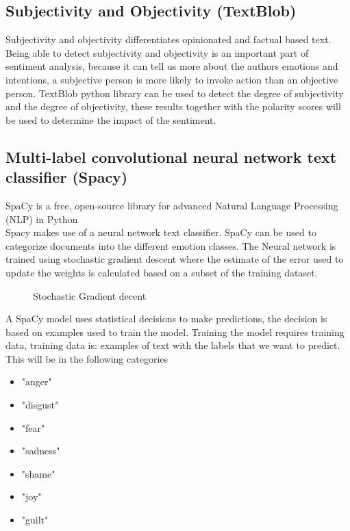 \clearpage
\subsection{Subjectivity and Objectivity (TextBlob)}
Subjectivity and objectivity differentiates opinionated and factual based text. \cite{ref2}
Being able to detect subjectivity and objectivity is an important part of sentiment analysis, because it can tell us more about the authors emotions and intentions, a subjective person is more likely to invoke action than an objective person. TextBlob python library can be used to detect the degree of subjectivity and the degree of objectivity, these results together with the polarity scores will be used to determine the impact of the sentiment. 


\subsection{Multi-label convolutional neural network text classifier (Spacy)}

SpaCy is a free, open-source library for advanced Natural Language Processing (NLP) in Python \\
Spacy makes use of a neural network text classifier. SpaCy can be used to categorize documents into the different emotion classes.
The Neural network is trained using stochastic gradient descent where the estimate of the error used to update the weights is calculated based on a subset of the training dataset. \\


\begin{figure}[h]
  \centering
  \caption[Stochastic gradient descent]%
  {Stochastic Gradient decent}
  \label{fig:ALAP:sm3}
\end{figure}






A SpaCy model uses statistical decisions to make predictions, the decision is based on examples used to train the model. Training the model requires training data, training data is: examples of text with the labels that we want to predict. This will be in the following categories
\begin{itemize}
\item "anger"
\item "disgust"
\item "fear"
\item "sadness"
\item "shame"
\item "joy"
\item "guilt"
\end{itemize}




